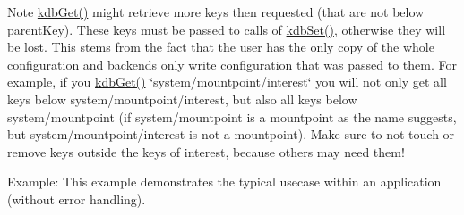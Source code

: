 \begin{DoxyNote}{Note}
\hyperlink{group__kdb_ga28e385fd9cb7ccfe0b2f1ed2f62453a1}{kdb\-Get()} might retrieve more keys then requested (that are not below parent\-Key). These keys must be passed to calls of \hyperlink{group__kdb_ga11436b058408f83d303ca5e996832bcf}{kdb\-Set()}, otherwise they will be lost. This stems from the fact that the user has the only copy of the whole configuration and backends only write configuration that was passed to them. For example, if you \hyperlink{group__kdb_ga28e385fd9cb7ccfe0b2f1ed2f62453a1}{kdb\-Get()} \char`\"{}system/mountpoint/interest\char`\"{} you will not only get all keys below system/mountpoint/interest, but also all keys below system/mountpoint (if system/mountpoint is a mountpoint as the name suggests, but system/mountpoint/interest is not a mountpoint). Make sure to not touch or remove keys outside the keys of interest, because others may need them!
\end{DoxyNote}
\begin{DoxyParagraph}{Example\-:}
This example demonstrates the typical usecase within an application (without error handling).
\end{DoxyParagraph}

